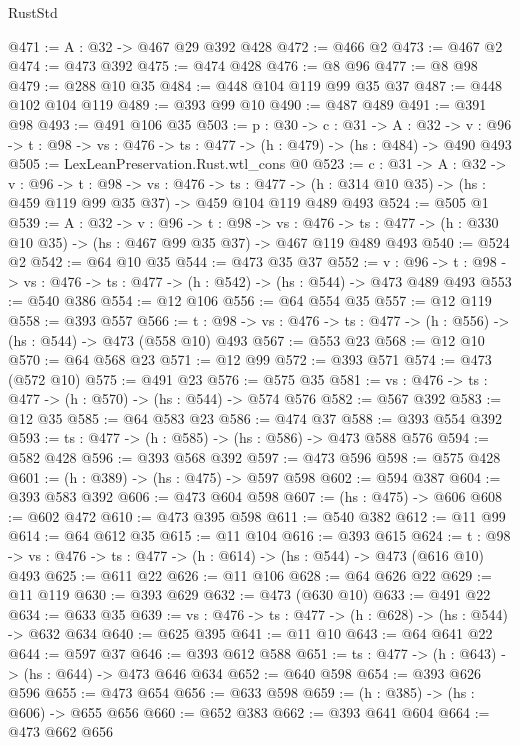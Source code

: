 \begin{lexlean}{RustStd}
\begin{coremodule}
{\begin{coremodule}
@471 := {A : @32} -> @467 @29 @392 @428
@472 := @466 @2
@473 := @467 @2
@474 := @473 @392
@475 := @474 @428
@476 := @8 @96
@477 := @8 @98
@479 := @288 @10 @35
@484 := @448 @104 @119 @99 @35 @37
@487 := @448 @102 @104 @119
@489 := @393 @99 @10
@490 := @487 @489
@491 := @391 @98
@493 := @491 @106 @35
@503 := {p : @30} ->
  {c : @31} ->
  {A : @32} ->
  {v : @96} -> {t : @98} -> {vs : @476} -> {ts : @477} -> (h : @479) -> (hs : @484) -> @490 @493
@505 := LexLeanPreservation.Rust.wtl_cons @0
@523 := {c : @31} ->
  {A : @32} ->
  {v : @96} ->
  {t : @98} ->
  {vs : @476} ->
  {ts : @477} -> (h : @314 @10 @35) -> (hs : @459 @119 @99 @35 @37) -> @459 @104 @119 @489 @493
@524 := @505 @1
@539 := {A : @32} ->
  {v : @96} ->
  {t : @98} ->
  {vs : @476} -> {ts : @477} -> (h : @330 @10 @35) -> (hs : @467 @99 @35 @37) -> @467 @119 @489 @493
@540 := @524 @2
@542 := @64 @10 @35
@544 := @473 @35 @37
@552 := {v : @96} ->
  {t : @98} -> {vs : @476} -> {ts : @477} -> (h : @542) -> (hs : @544) -> @473 @489 @493
@553 := @540 @386
@554 := @12 @106
@556 := @64 @554 @35
@557 := @12 @119
@558 := @393 @557
@566 := {t : @98} -> {vs : @476} -> {ts : @477} -> (h : @556) -> (hs : @544) -> @473 (@558 @10) @493
@567 := @553 @23
@568 := @12 @10
@570 := @64 @568 @23
@571 := @12 @99
@572 := @393 @571
@574 := @473 (@572 @10)
@575 := @491 @23
@576 := @575 @35
@581 := {vs : @476} -> {ts : @477} -> (h : @570) -> (hs : @544) -> @574 @576
@582 := @567 @392
@583 := @12 @35
@585 := @64 @583 @23
@586 := @474 @37
@588 := @393 @554 @392
@593 := {ts : @477} -> (h : @585) -> (hs : @586) -> @473 @588 @576
@594 := @582 @428
@596 := @393 @568 @392
@597 := @473 @596
@598 := @575 @428
@601 := (h : @389) -> (hs : @475) -> @597 @598
@602 := @594 @387
@604 := @393 @583 @392
@606 := @473 @604 @598
@607 := (hs : @475) -> @606
@608 := @602 @472
@610 := @473 @395 @598
@611 := @540 @382
@612 := @11 @99
@614 := @64 @612 @35
@615 := @11 @104
@616 := @393 @615
@624 := {t : @98} -> {vs : @476} -> {ts : @477} -> (h : @614) -> (hs : @544) -> @473 (@616 @10) @493
@625 := @611 @22
@626 := @11 @106
@628 := @64 @626 @22
@629 := @11 @119
@630 := @393 @629
@632 := @473 (@630 @10)
@633 := @491 @22
@634 := @633 @35
@639 := {vs : @476} -> {ts : @477} -> (h : @628) -> (hs : @544) -> @632 @634
@640 := @625 @395
@641 := @11 @10
@643 := @64 @641 @22
@644 := @597 @37
@646 := @393 @612 @588
@651 := {ts : @477} -> (h : @643) -> (hs : @644) -> @473 @646 @634
@652 := @640 @598
@654 := @393 @626 @596
@655 := @473 @654
@656 := @633 @598
@659 := (h : @385) -> (hs : @606) -> @655 @656
@660 := @652 @383
@662 := @393 @641 @604
@664 := @473 @662 @656

\end{coremodule}}
\end{coremodule}
\end{lexlean}
